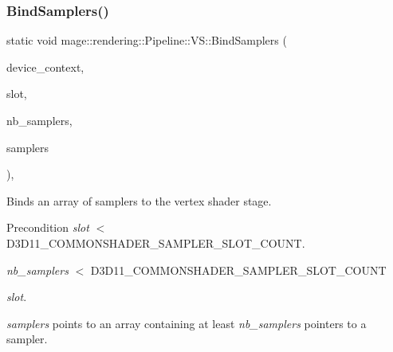 \subsubsection{\texorpdfstring{Bind\+Samplers()}{BindSamplers()}}
{\footnotesize\ttfamily static void mage\+::rendering\+::\+Pipeline\+::\+V\+S\+::\+Bind\+Samplers (\begin{DoxyParamCaption}\item[{I\+D3\+D11\+Device\+Context \&}]{device\+\_\+context,  }\item[{\mbox{\hyperlink{namespacemage_aa5d6eaabaac3cdd01873d6a3d27e90f3}{U32}}}]{slot,  }\item[{\mbox{\hyperlink{namespacemage_aa5d6eaabaac3cdd01873d6a3d27e90f3}{U32}}}]{nb\+\_\+samplers,  }\item[{I\+D3\+D11\+Sampler\+State $\ast$const $\ast$}]{samplers }\end{DoxyParamCaption})\hspace{0.3cm}{\ttfamily [static]}, {\ttfamily [noexcept]}}

Binds an array of samplers to the vertex shader stage.

\begin{DoxyPrecond}{Precondition}
{\itshape slot} $<$ {\ttfamily D3\+D11\+\_\+\+C\+O\+M\+M\+O\+N\+S\+H\+A\+D\+E\+R\+\_\+\+S\+A\+M\+P\+L\+E\+R\+\_\+\+S\+L\+O\+T\+\_\+\+C\+O\+U\+NT}. 

{\itshape nb\+\_\+samplers} $<$ {\ttfamily D3\+D11\+\_\+\+C\+O\+M\+M\+O\+N\+S\+H\+A\+D\+E\+R\+\_\+\+S\+A\+M\+P\+L\+E\+R\+\_\+\+S\+L\+O\+T\+\_\+\+C\+O\+U\+NT} 
\begin{DoxyItemize}
\item {\itshape slot}. 
\end{DoxyItemize}

{\itshape samplers} points to an array containing at least {\itshape nb\+\_\+samplers} pointers to a sampler. 
\end{DoxyPrecond}

